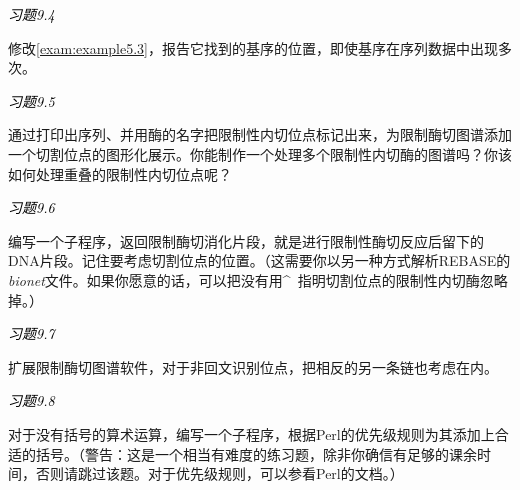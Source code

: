\textcolor{black}{\textit{习题9.4}}
\begin{adjustwidth}{4em}{}
修改\autoref{exam:example5.3}，报告它找到的基序的位置，即使基序在序列数据中出现多次。
\end{adjustwidth}

\textcolor{black}{\textit{习题9.5}}
\begin{adjustwidth}{4em}{}
通过打印出序列、并用酶的名字把限制性内切位点标记出来，为限制酶切图谱添加一个切割位点的图形化展示。你能制作一个处理多个限制性内切酶的图谱吗？你该如何处理重叠的限制性内切位点呢？
\end{adjustwidth}

\textcolor{black}{\textit{习题9.6}}
\begin{adjustwidth}{4em}{}
编写一个子程序，返回限制酶切消化片段，就是进行限制性酶切反应后留下的DNA片段。记住要考虑切割位点的位置。（这需要你以另一种方式解析REBASE的\textit{bionet}文件。如果你愿意的话，可以把没有用\^~指明切割位点的限制性内切酶忽略掉。）
\end{adjustwidth}


\textcolor{black}{\textit{习题9.7}}
\begin{adjustwidth}{4em}{}
扩展限制酶切图谱软件，对于非回文识别位点，把相反的另一条链也考虑在内。
\end{adjustwidth}

\textcolor{black}{\textit{习题9.8}}
\begin{adjustwidth}{4em}{}
对于没有括号的算术运算，编写一个子程序，根据Perl的优先级规则为其添加上合适的括号。（警告：这是一个相当有难度的练习题，除非你确信有足够的课余时间，否则请跳过该题。对于优先级规则，可以参看Perl的文档。）
\end{adjustwidth}

